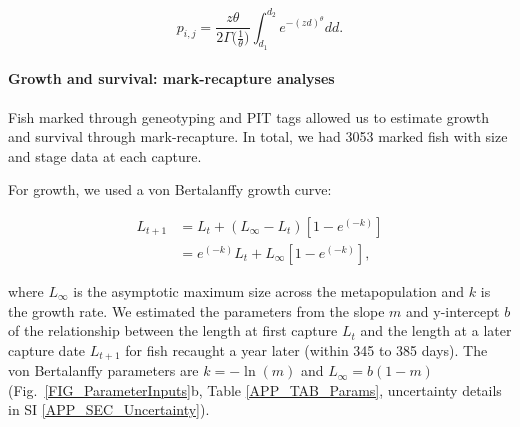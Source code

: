 \documentclass[12pt, oneside]{article}   	%
\begin{document}
\begin{equation} %
p_{i,j} = \frac{z\theta}{2\Gamma({\frac{1}{\theta})}} \int_{d_1}^{d_2}e^{-(zd)^\theta}  dd. \label{EQN_integratingDK}
\end{equation}

\paragraph*{Growth and survival: mark-recapture analyses}

Fish marked through geneotyping and PIT tags allowed us to estimate growth and survival through mark-recapture. In total, we had 3053 marked fish with size and stage data at each capture. 

For growth, we used a von Bertalanffy growth curve:

\begin{equation} \label{EQN_VBL} 
\begin{split}
L_{t+1} & = L_t + (L_\infty - L_t)[1 - e^{(-k)}] \\
 & = e^{(-k)}L_t + L_\infty[1 - e^{(-k)}],
\end{split}
\end{equation}

where $L_\infty$ is the asymptotic maximum size across the metapopulation and $k$ is the growth rate. We estimated the parameters from the slope $m$ and y-intercept $b$ of the relationship between the length at first capture $L_t$ and the length at a later capture date $L_{t+1}$ for fish recaught a year later (within 345 to 385 days). The von Bertalanffy parameters are $k = -\ln(m)$ and $L_\infty = b(1-m)$ \citep{hart2009estimating} (Fig.\ \ref{FIG_ParameterInputs}b, Table \ref{APP_TAB_Params}, uncertainty details in SI \ref{APP_SEC_Uncertainty}).
\end{document}
